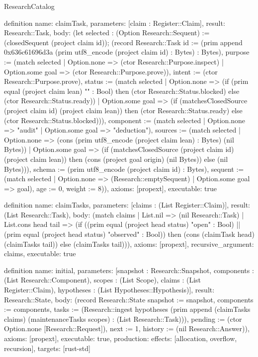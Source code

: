 \begin{lexlean}{ResearchCatalog}
\begin{semanticmodule}
definition{
  name: claimTask,
  parameters: [claim : Register::Claim],
  result: Research::Task,
  body: (let selected : (Option Research::Sequent) := (closedSequent (project claim id));
    (record Research::Task {
      id := (prim append 0x636c61696d3a (prim utf8_encode (project claim id) : Bytes) : Bytes),
      purpose := (match selected | Option.none => (ctor Research::Purpose.inspect) | Option.some goal => (ctor Research::Purpose.prove)),
      intent := (ctor Research::Purpose.prove),
      status := (match selected | Option.none => (if (prim equal (project claim lean) "" : Bool) then (ctor Research::Status.blocked) else (ctor Research::Status.ready)) | Option.some goal => (if (matchesClosedSource (project claim id) (project claim lean)) then (ctor Research::Status.ready) else (ctor Research::Status.blocked))),
      component := (match selected | Option.none => "audit" | Option.some goal => "deduction"),
      sources := (match selected | Option.none => (cons (prim utf8_encode (project claim lean) : Bytes) (nil Bytes)) | Option.some goal => (if (matchesClosedSource (project claim id) (project claim lean)) then (cons (project goal origin) (nil Bytes)) else (nil Bytes))),
      schema := (prim utf8_encode (project claim id) : Bytes),
      sequent := (match selected | Option.none => (Research::emptySequent) | Option.some goal => goal),
      age := 0, weight := 8})),
  axioms: [propext],
  executable: true
}

definition{
  name: claimTasks,
  parameters: [claims : (List Register::Claim)],
  result: (List Research::Task),
  body: (match claims
    | List.nil => (nil Research::Task)
    | List.cons head tail => (if ((prim equal (project head status) "open" : Bool) || (prim equal (project head status) "observed" : Bool)) then (cons (claimTask head) (claimTasks tail)) else (claimTasks tail))),
  axioms: [propext],
  recursive_argument: claims,
  executable: true
}

definition{
  name: initial,
  parameters: [snapshot : Research::Snapshot, components : (List Research::Component), scopes : (List Scope), claims : (List Register::Claim), hypotheses : (List Hypotheses::Hypothesis)],
  result: Research::State,
  body: (record Research::State {snapshot := snapshot, components := components, tasks := (Research::ingest hypotheses (prim append (claimTasks claims) (maintenanceTasks scopes) : (List Research::Task))), pending := (ctor Option.none [Research::Request]), next := 1, history := (nil Research::Answer)}),
  axioms: [propext],
  executable: true,
  production: {effects: [allocation, overflow, recursion], targets: [rust-std]}
}


\end{semanticmodule}
\end{lexlean}

